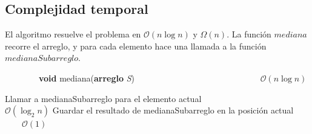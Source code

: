 \documentclass[spanish,a4paper]{article}
\begin{document}
\subsection{Complejidad temporal}
El algoritmo resuelve el problema en $\mathcal{O}(n \log n)$ y $\Omega(n)$. La función $mediana$ recorre el arreglo, y para cada elemento hace una llamada a la función $medianaSubarreglo$.

\begin{algorithm}
\caption{\ \ \ \ \ \ \ \ \textbf{void} mediana(\textbf{arreglo} \textit{S}) \ \ \ \ \ \ \ \ \ \ \ \ \ \ \ \ \ \ \ \ \ \ \ \ \ \ \ \ \ $\mathcal{O}(n\log{}n)$}
\label{alg2}        %
\begin{algorithmic}

        \STATE Llamar a medianaSubarreglo para el elemento actual \ \ \ \ \ \ \ \ \ \ \ \ \ \ \ \ \ \ \ \ $\mathcal{O}(\log_2 n)$
        \STATE Guardar el resultado de medianaSubarreglo en la posición actual \ \ \ \ $\mathcal{O}(1)$
    \ENDFOR

\end{algorithmic}
\end{algorithm}
\end{document}
